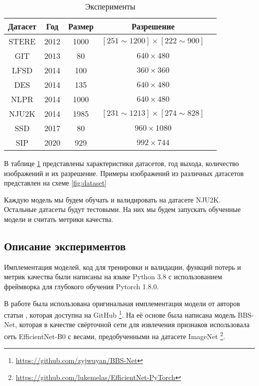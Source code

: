 \begin{center}
    \begin{table}
        \begin{tabular}{|c|c|c|c|c|} 
            \hline
            Датасет & Год & Размер & Разрешение\\
            \hline
            \hline
            STERE\cite{STERE} & 2012 & 1000 & $[251 \sim 1200] \times [222 \sim 900]$ \\
            \hline
            GIT\cite{GIT} & 2013 & 80 & $640 \times 480$ \\
            \hline
            LFSD\cite{LFSD} & 2014 & 100 & $360 \times 360$ \\
            \hline
            DES\cite{DES} & 2014 & 135 & $640 \times 480$  \\
            \hline
            NLPR\cite{NLPR} & 2014 & 1000 &  $640 \times 480$ \\
            \hline
            NJU2K\cite{NJU2K} & 2014 & 1985 & $[231 \sim 1213] \times [274 \sim 828]$\\
            \hline
            SSD\cite{SSD} & 2017 & 80 & $960 \times 1080$\\
            \hline
            SIP\cite{Rethinking-RGBD} & 2020 & 929 &  $992 \times 744$\\
            \hline
        \end{tabular}
    \caption{Эксперименты}
    \label{tab:datasets}
    \end{table}
\end{center}

В таблице \ref{tab:datasets} представлены характеристики датасетов, год выхода, количество изображений и их разрешение.
Примеры изображений из различных датасетов представлен на схеме \ref{fig:dataset}


Каждую модель мы будем обучать и валидировать на датасете NJU2K. Остальные датасеты будут тестовыми. На них мы будем
запускать обученные модели и считать метрики качества.

\subsection{Описание экспериментов}

Имплементация моделей, код для тренировки и валидации, функций потерь и метрик качества были написаны на языке Python 3.8
с использованием фреймворка для глубокого обучения Pytorch 1.8.0\cite{Pytorch}.


В работе была использована оригинальная имплементация модели от авторов статьи \cite{BBS}, 
которая доступна на GitHub \footnote{\url{https://github.com/zyjwuyan/BBS-Net}}.
На её основе была написана модель BBS-Net, которая в качестве свёрточной сети для извлечения признаков
использовала сеть EfficientNet-B0 \cite{Efficientnet} с весами, предобученными на датасете ImageNet
\footnote{\url{https://github.com/lukemelas/EfficientNet-PyTorch}}.


